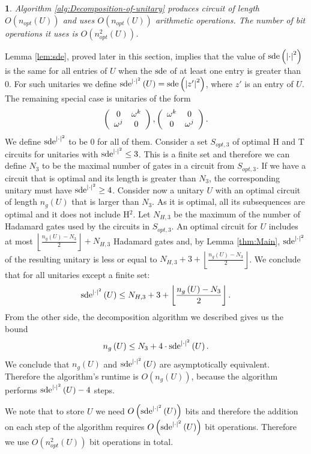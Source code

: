 \documentclass[english,journal]{extarticle}
\makeatletter
\theoremstyle{plain}
\theoremstyle{plain}
\theoremstyle{plain}
\theoremstyle{definition}
\theoremstyle{plain}
\newtheorem{cor}{\protect\corollaryname}
\newenvironment{proof}[1][\proofname]{\par
     \normalfont\topsep6\p@\@plus6\p@\relax
     \trivlist
     \itemindent\parindent
     \item[\hskip\labelsep
           \scshape
       #1]\ignorespaces
   }{%
     \endtrivlist\@endpefalse
   }
\providecommand{\proofname}{Proof}
\theoremstyle{plain}
\providecommand{\corollaryname}{\inputencoding{latin9}Corollary}
\makeatother
\begin{document}
\begin{cor}
Algorithm \ref{alg:Decomposition-of-unitary} produces circuit of length $O(n_{opt}(U))$ 
and uses $O(n_{opt}(U))$ arithmetic operations.  The number of bit operations it uses is $O(n_{opt}^2(U))$. \end{cor}
\begin{proof}
Lemma \ref{lem:sde}, proved later in this section,
implies that the value of $\mathrm{sde}\left(\left|\cdot\right|^{2}\right)$ is the same for all
entries of $U$ when the $\mathrm{sde}$ of at least one entry is greater
than $0$. For such unitaries we define
$\mathrm{sde}^{\left|\cdot\right|^{2}}\left(U\right)=\mathrm{sde}\left(\left|z'\right|^{2}\right)$,
where $z'$ is an entry of $U$.  The remaining special case is unitaries
of the form 
\[
\left(\begin{array}{cc}
0 & \omega^{k}\\
\omega^{j} & 0
\end{array}\right),\left(\begin{array}{cc}
\omega^{k} & 0\\
0 & \omega^{j}
\end{array}\right).
\]
We define $\mathrm{sde}^{\left|\cdot\right|^{2}}$ to be $0$ for all of them. Consider
a set $S_{opt,3}$ of optimal H and T circuits for unitaries with
$\mathrm{sde}^{\left|\cdot\right|^{2}}\le 3$.
This is a finite set and therefore we can define $N_{3}$ to be
the maximal number of gates in a circuit from $S_{opt,3}$.  If we have a circuit
that is optimal and its length is greater than $N_{3}$, the corresponding
unitary must have $\mathrm{sde}^{\left|\cdot\right|^{2}}\ge 4$. Consider now a unitary
$U$ with an optimal circuit of length $n_g\left(U\right)$ that is larger
than $N_{3}$.  As it is optimal, all its subsequences are optimal
and it does not include H${}^2$.  Let $N_{H,3}$ be the maximum of the number
of Hadamard gates used by the circuits in $S_{opt,3}$. An optimal circuit for $U$
includes at most $\left\lfloor \frac{n_g\left(U\right)-N_{3}}{2}\right\rfloor
+N_{H,3}$
Hadamard gates and, by Lemma \ref{thm:Main}, $\mathrm{sde}^{\left|\cdot\right|^{2}}$
of the resulting unitary is less or equal to $N_{H,3}+3+\left\lfloor
\frac{n_g\left(U\right)-N_{3}}{2}\right\rfloor $.
We conclude that for all unitaries except a finite set: 
\[
\mathrm{sde}^{\left|\cdot\right|^{2}}\left(U\right)\le N_{H,3}+3+\left\lfloor
\frac{n_g\left(U\right)-N_{3}}{2}\right\rfloor.
\]
From the other side, the decomposition algorithm we described gives
us the bound
\[
n_g\left(U\right)\le N_{3}+4\cdot\mathrm{sde}^{\left|\cdot\right|^{2}}\left(U\right).
\]
We conclude that $n_g\left(U\right)$ and
$\mathrm{sde}^{\left|\cdot\right|^{2}}\left(U\right)$
are asymptotically equivalent. Therefore the algorithm's runtime is
$O\left(n_g\left(U\right)\right)$,
because the algorithm performs $\mathrm{sde}^{\left|\cdot\right|^{2}}\left(U\right)-4$
steps.
    
We note that to store $U$ we need $O\left(\mathrm{sde}^{\left|\cdot\right|^{2}}\left(U\right)\right)$ bits 
and therefore the addition on each step of the algorithm requires  $O\left(\mathrm{sde}^{\left|\cdot\right|^{2}}\left(U\right)\right)$ bit 
operations. Therefore we use $O(n_{opt}^2(U))$ bit operations in total.
\end{proof}
\end{document}
